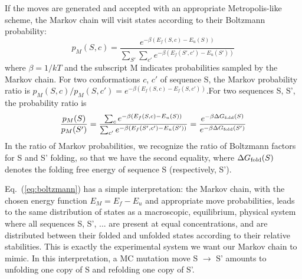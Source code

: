 If the moves are generated and accepted with an appropriate Metropolis-like scheme, the Markov chain will
visit states according to their Boltzmann probability: 
\begin{equation}  \label{eq:proba}
p_M(S,c) = \frac{ e^{-\beta(E_f(S,c)-E_u(S))} }{ \sum_{S'} \sum_{c'} e^{-\beta(E_f(S',c')-E_u(S'))} }
\end{equation}
where $\beta =1/kT$ and the subscript M indicates probabilities sampled by the Markov chain.
For two conformations $c$, $c'$ of sequence S, the Markov probability ratio is $p_M(S,c)/p_M(S,c') = e^{-\beta (E_f(S,c)-E_f(S,c'))}$.For two sequences S, S', the probability ratio is
\begin{equation}  \label{eq:boltzmann}
\frac{p_M(S)}{p_M(S')} = \frac{ \sum_c e^{-\beta (E_f(S,c)-E_u(S))} }
                             { \sum_{c'} e^{-\beta(E_f(S',c')-E_u(S'))} }
                      = \frac{ e^{-\beta \Delta G_{\rm fold}(S)}}{e^{-\beta \Delta G_{\rm fold}(S')}}
\end{equation}
In the ratio of Markov probabilities, we recognize the ratio of Boltzmann factors for S and S' folding, so that we
have the second equality, where $\Delta G_{\rm fold}(S)$ denotes the folding free energy of sequence S (respectively, S').

Eq.\ (\ref{eq:boltzmann}) has a simple interpretation: the Markov chain, with the chosen energy function $E_M =E_f - E_u$ and appropriate move probabilities, leads to the same distribution of states as a macroscopic, equilibrium,
physical system where all sequences S, S', ... are present at equal concentrations, and are distributed between their
folded and unfolded states according to their relative stabilities.
This is exactly the experimental system we want our Markov chain to mimic.
In this interpretation, a MC mutation move S $\rightarrow$ S' amounts to unfolding one copy of S and refolding one copy of S'.

